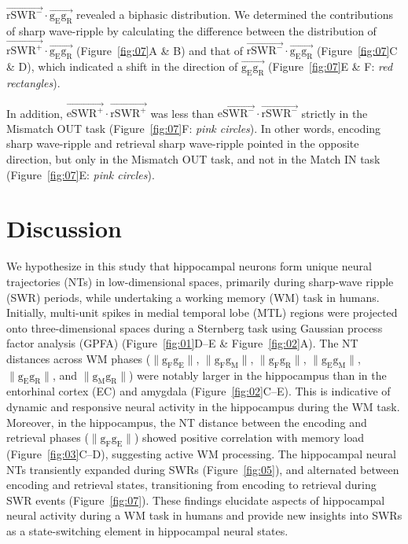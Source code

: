 \documentclass[final,3p,times,twocolumn]{elsarticle}
\begin{document}
$\overrightarrow{\mathrm{rSWR^-}} \cdot \overrightarrow{\mathrm{g_{E}g_{R}}}$ revealed a biphasic distribution. We determined the contributions of sharp wave-ripple by calculating the difference between the distribution of $\overrightarrow{\mathrm{rSWR^+}} \cdot \overrightarrow{\mathrm{g_{E}g_{R}}}$ (Figure~\ref{fig:07}A \& B) and that of $\overrightarrow{\mathrm{rSWR^-}} \cdot \overrightarrow{\mathrm{g_{E}g_{R}}}$ (Figure~\ref{fig:07}C \& D), which indicated a shift in the direction of $\overrightarrow{\mathrm{g_{E}g_{R}}}$ (Figure~\ref{fig:07}E \& F: \textit{red rectangles}).

In addition, $\overrightarrow{\mathrm{eSWR^+}} \cdot \overrightarrow{\mathrm{rSWR^+}}$ was less than $\overrightarrow{\mathrm{eSWR^-}} \cdot \overrightarrow{\mathrm{rSWR^-}}$ strictly in the Mismatch OUT task (Figure~\ref{fig:07}F: \textit{pink circles}). In other words, encoding sharp wave-ripple and retrieval sharp wave-ripple pointed in the opposite direction, but only in the Mismatch OUT task, and not in the Match IN task (Figure~\ref{fig:07}E: \textit{pink circles}).
\label{sec:results}
\section{Discussion}
We hypothesize in this study that hippocampal neurons form unique neural trajectories (NTs) in low-dimensional spaces, primarily during sharp-wave ripple (SWR) periods, while undertaking a working memory (WM) task in humans. Initially, multi-unit spikes in medial temporal lobe (MTL) regions were projected onto three-dimensional spaces during a Sternberg task using Gaussian process factor analysis (GPFA) (Figure~\ref{fig:01}D--E \& Figure~\ref{fig:02}A). The NT distances across WM phases ($\mathrm{\lVert g_{F}g_{E} \rVert}$, $\mathrm{\lVert g_{F}g_{M} \rVert}$, $\mathrm{\lVert g_{F}g_{R} \rVert}$, $\mathrm{\lVert g_{E}g_{M} \rVert}$, $\mathrm{\lVert g_{E}g_{R} \rVert}$, and $\mathrm{\lVert g_{M}g_{R} \rVert}$) were notably larger in the hippocampus than in the entorhinal cortex (EC) and amygdala (Figure~\ref{fig:02}C--E). This is indicative of dynamic and responsive neural activity in the hippocampus during the WM task. Moreover, in the hippocampus, the NT distance between the encoding and retrieval phases ($\mathrm{\lVert g_{F}g_{E} \rVert}$) showed positive correlation with memory load (Figure~\ref{fig:03}C--D), suggesting active WM processing. The hippocampal neural NTs transiently expanded during SWRs (Figure~\ref{fig:05}), and alternated between encoding and retrieval states, transitioning from encoding to retrieval during SWR events (Figure~\ref{fig:07}). These findings elucidate aspects of hippocampal neural activity during a WM task in humans and provide new insights into SWRs as a state-switching element in hippocampal neural states.
\end{document}

